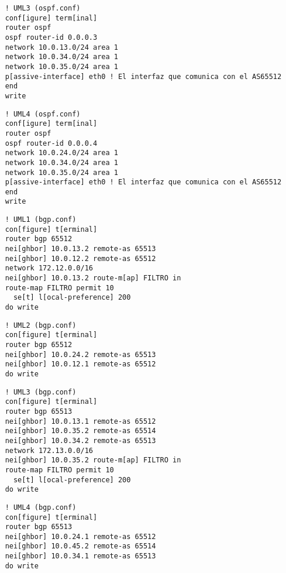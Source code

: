   \begin{verbatim}
    ! UML3 (ospf.conf)
    conf[igure] term[inal]
    router ospf
    ospf router-id 0.0.0.3
    network 10.0.13.0/24 area 1
    network 10.0.34.0/24 area 1
    network 10.0.35.0/24 area 1
    p[assive-interface] eth0 ! El interfaz que comunica con el AS65512
    end
    write
  \end{verbatim}

  \begin{verbatim}
    ! UML4 (ospf.conf)
    conf[igure] term[inal]
    router ospf
    ospf router-id 0.0.0.4
    network 10.0.24.0/24 area 1
    network 10.0.34.0/24 area 1
    network 10.0.35.0/24 area 1
    p[assive-interface] eth0 ! El interfaz que comunica con el AS65512
    end
    write
  \end{verbatim}

  \begin{verbatim}
    ! UML1 (bgp.conf)
    con[figure] t[erminal]
    router bgp 65512
    nei[ghbor] 10.0.13.2 remote-as 65513
    nei[ghbor] 10.0.12.2 remote-as 65512
    network 172.12.0.0/16
    nei[ghbor] 10.0.13.2 route-m[ap] FILTRO in
    route-map FILTRO permit 10
      se[t] l[ocal-preference] 200
    do write
  \end{verbatim}

  \begin{verbatim}
    ! UML2 (bgp.conf)
    con[figure] t[erminal]
    router bgp 65512
    nei[ghbor] 10.0.24.2 remote-as 65513
    nei[ghbor] 10.0.12.1 remote-as 65512
    do write
  \end{verbatim}

  \begin{verbatim}
    ! UML3 (bgp.conf)
    con[figure] t[erminal]
    router bgp 65513
    nei[ghbor] 10.0.13.1 remote-as 65512
    nei[ghbor] 10.0.35.2 remote-as 65514
    nei[ghbor] 10.0.34.2 remote-as 65513
    network 172.13.0.0/16
    nei[ghbor] 10.0.35.2 route-m[ap] FILTRO in
    route-map FILTRO permit 10
      se[t] l[ocal-preference] 200
    do write
  \end{verbatim}

  \begin{verbatim}
    ! UML4 (bgp.conf)
    con[figure] t[erminal]
    router bgp 65513
    nei[ghbor] 10.0.24.1 remote-as 65512
    nei[ghbor] 10.0.45.2 remote-as 65514
    nei[ghbor] 10.0.34.1 remote-as 65513
    do write
  \end{verbatim}

